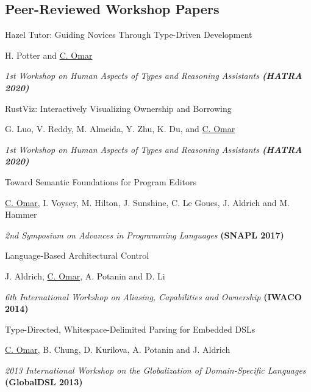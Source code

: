 \documentclass[10pt,letterpaper]{article}
\renewenvironment{itemize}{
  \begin{list}{}{
    \setlength{\leftmargin}{1.25em}
    \setlength{\itemsep}{0.25em}
    \setlength{\parskip}{0pt}
    \setlength{\parsep}{0.2em}
  }
}{
  \end{list}
}
\begin{document}
\subsection*{Peer-Reviewed Workshop Papers}

\begin{enumerate}[resume]
\item Hazel Tutor: Guiding Novices Through Type-Driven Development 
  \begin{itemize}
    \item H. Potter and \underline{C. Omar}
    \item \textit{1st Workshop on Human Aspects of Types and Reasoning Assistants \textbf{(HATRA 2020)}}
  \end{itemize}
\item RustViz: Interactively Visualizing Ownership and Borrowing
  \begin{itemize}
    \item G. Luo, V. Reddy, M. Almeida, Y. Zhu, K. Du, and \underline{C. Omar}
    \item \textit{1st Workshop on Human Aspects of Types and Reasoning Assistants \textbf{(HATRA 2020)}}
  \end{itemize}
\item Toward Semantic Foundations for Program Editors
  \begin{itemize}
    \item \underline{C. Omar}, I. Voysey, M. Hilton, J. Sunshine, C. Le Goues, J. Aldrich and M. Hammer
    \item \textit{2nd Symposium on Advances in Programming Languages} {\textbf{(SNAPL 2017)}}
  \end{itemize}
\item Language-Based Architectural Control
  \begin{itemize}
    \item J. Aldrich, \underline{C. Omar}, A. Potanin and D. Li
    \item \textit{6th International Workshop on Aliasing, Capabilities and Ownership} {\textbf{(IWACO 2014)}}
  \end{itemize}
\item Type-Directed, Whitespace-Delimited Parsing for Embedded DSLs
  \begin{itemize}
    \item \underline{C. Omar}, B. Chung, D. Kurilova, A. Potanin and J. Aldrich
    \item \textit{2013 International Workshop on the Globalization of Domain-Specific Languages} {\textbf{(GlobalDSL 2013)}}
  \end{itemize}
\end{enumerate}
\end{document}
